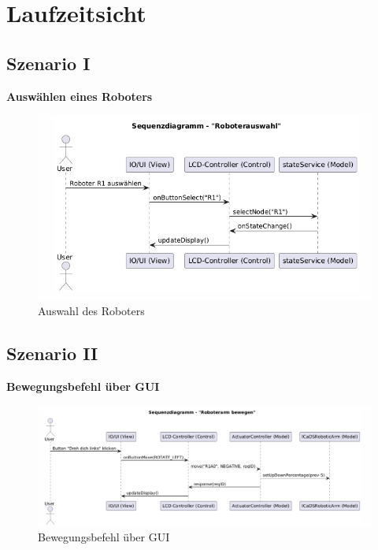 
\chapter{Laufzeitsicht}

\section{Szenario I}
\textbf{Auswählen eines Roboters}\\

\begin{figure}[h]
    \centering
    \includegraphics[width=0.8\linewidth]{diagrams/roboterAuswahl_250525.png}
    \caption{Auswahl des Roboters}
    \label{fig:Auswahl}
\end{figure}

\clearpage
\section{Szenario II}
\textbf{Bewegungsbefehl über GUI}\\

\begin{figure}[h]  
    \centering
    \includegraphics[width=0.8\linewidth]{diagrams/moveBefehl_250525.png}
    \caption{Bewegungsbefehl über GUI}
    \label{fig:Bewegungsbefehl}
\end{figure}





